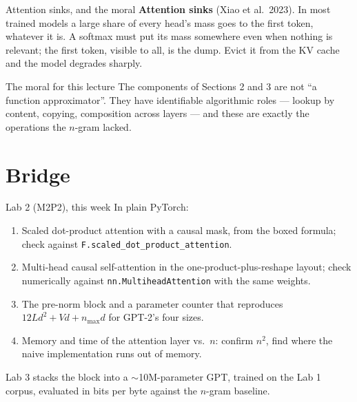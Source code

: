 \documentclass[11pt,aspectratio=169]{beamer}
\begin{document}
\begin{frame}{Attention sinks, and the moral}
  \textbf{Attention sinks} (Xiao et al.\ 2023). In most trained models a large share of
  every head's mass goes to the first token, whatever it is. A softmax must put its mass
  somewhere even when nothing is relevant; the first token, visible to all, is the dump.
  Evict it from the KV cache and the model degrades sharply.

  \vspace{1.2em}
  \begin{block}{The moral for this lecture}
    The components of Sections 2 and 3 are not ``a function approximator''. They have
    identifiable algorithmic roles --- lookup by content, copying, composition across layers
    --- and these are exactly the operations the $n$-gram lacked.
  \end{block}
\end{frame}

\section{Bridge}

\begin{frame}{Lab 2 (M2P2), this week}
  In plain PyTorch:
  \begin{enumerate}
    \item Scaled dot-product attention with a causal mask, from the boxed formula; check
          against \texttt{F.scaled\_dot\_product\_attention}.
    \item Multi-head causal self-attention in the one-product-plus-reshape layout; check
          numerically against \texttt{nn.MultiheadAttention} with the same weights.
    \item The pre-norm block and a parameter counter that reproduces $12Ld^2 + Vd + n_{\max}d$
          for GPT-2's four sizes.
    \item Memory and time of the attention layer vs.\ $n$: confirm $n^2$, find where the naive
          implementation runs out of memory.
  \end{enumerate}

  \vspace{0.6em}
  Lab 3 stacks the block into a $\sim$10M-parameter GPT, trained on the Lab 1 corpus,
  evaluated in bits per byte against the $n$-gram baseline.
\end{frame}
\end{document}
